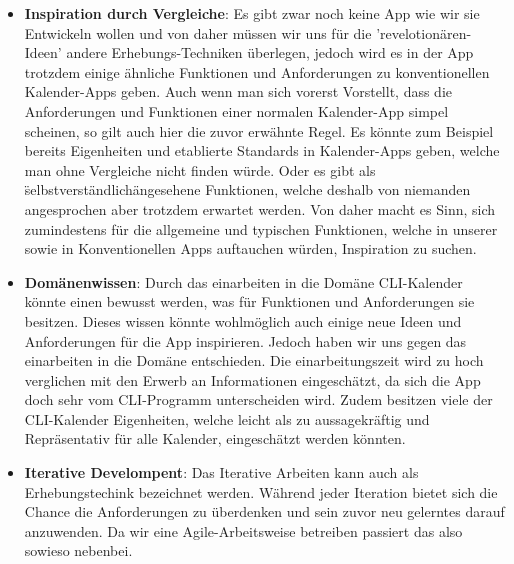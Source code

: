\begin{itemize}
	\item \textbf{Inspiration durch Vergleiche}: Es gibt zwar noch keine App wie wir sie Entwickeln wollen und von daher müssen wir uns für die 'revelotionären-Ideen' andere Erhebungs-Techniken überlegen, jedoch wird es in der App trotzdem einige ähnliche Funktionen und Anforderungen zu konventionellen Kalender-Apps geben. Auch wenn man sich vorerst Vorstellt, dass die Anforderungen und Funktionen einer normalen Kalender-App simpel scheinen, so gilt auch hier die zuvor erwähnte Regel. Es könnte zum Beispiel bereits Eigenheiten und etablierte Standards in Kalender-Apps geben, welche man ohne Vergleiche nicht finden würde. Oder es gibt als \"selbstverständlich\" angesehene Funktionen, welche deshalb von niemanden angesprochen aber trotzdem erwartet werden. Von daher macht es Sinn, sich zumindestens für die allgemeine und typischen Funktionen, welche in unserer sowie in Konventionellen Apps auftauchen würden, Inspiration zu suchen. 
	\item \textbf{Domänenwissen}: Durch das einarbeiten in die Domäne CLI-Kalender könnte einen bewusst werden, was für Funktionen und Anforderungen sie besitzen. Dieses wissen könnte wohlmöglich auch einige neue Ideen und Anforderungen für die App inspirieren. Jedoch haben wir uns gegen das einarbeiten in die Domäne entschieden. Die einarbeitungszeit wird zu hoch verglichen mit den Erwerb an Informationen eingeschätzt, da sich die App doch sehr vom CLI-Programm unterscheiden wird. Zudem besitzen viele der CLI-Kalender Eigenheiten, welche leicht als zu aussagekräftig und Repräsentativ für alle Kalender, eingeschätzt werden könnten.  
	\item \textbf{Iterative Develompent}: Das Iterative Arbeiten kann auch als Erhebungstechink bezeichnet werden. Während jeder Iteration bietet sich die Chance die Anforderungen zu überdenken und sein zuvor neu gelerntes darauf anzuwenden. Da wir eine Agile-Arbeitsweise betreiben passiert das also sowieso nebenbei.
\end{itemize}


